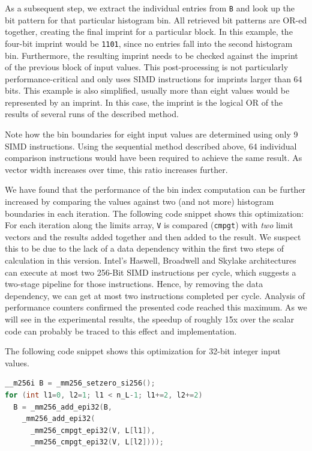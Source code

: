 \documentclass[sigconf]{acmart}
\begin{document}
\bigskip

As a subsequent step, we extract the individual entries from \texttt{B} and look up the bit pattern for that particular histogram bin. All retrieved bit patterns are OR-ed together, creating the final imprint for a particular block. In this example, the four-bit imprint would be \texttt{1101}, since no entries fall into the second histogram bin. Furthermore, the resulting imprint needs to be checked against the imprint of the previous block of input values. This post-processing is not particularly performance-critical and only uses SIMD instructions for imprints larger than 64 bits. This example is also simplified, usually more than eight values would be represented by an imprint. In this case, the imprint is the logical OR of the results of several runs of the described method.

Note how the bin boundaries for eight input values are determined using only 9 SIMD instructions. Using the sequential method described above, 64 individual comparison instructions would have been required to achieve the same result. As vector width increases over time, this ratio increases further.

We have found that the performance of the bin index computation can be further increased by comparing the values against two (and not more) histogram boundaries in each iteration. The following code snippet shows this optimization: For each iteration along the limits array, \texttt{V} is compared (\texttt{cmpgt}) with \emph{two} limit vectors and the results added together and then added to the result. We suspect this to be due to the lack of a data dependency within the first two steps of calculation in this version. Intel's Haswell, Broadwell and Skylake architectures can execute at most two 256-Bit SIMD instructions per cycle, which suggests a two-stage pipeline for those instructions. Hence, by removing the data dependency, we can get at most two instructions completed per cycle. Analysis of performance counters confirmed the presented code reached this maximum. As we will see in the experimental results, the speedup of roughly 15x over the scalar code can probably be traced to this effect and implementation.

The following code snippet shows this optimization for 32-bit integer input values.

\begin{lstlisting}[language=c]
__m256i B = _mm256_setzero_si256();
for (int l1=0, l2=1; l1 < n_L-1; l1+=2, l2+=2) 
  B = _mm256_add_epi32(B, 
    _mm256_add_epi32(
      _mm256_cmpgt_epi32(V, L[l1]),
      _mm256_cmpgt_epi32(V, L[l2])));		
\end{lstlisting}
\end{document}

